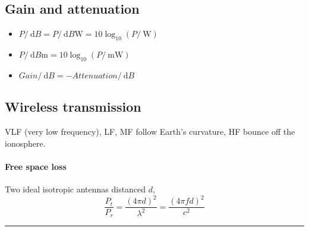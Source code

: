 \documentclass{form}
\begin{document}
\begin{minipage}[c]{0.20\textwidth}

    \subsection*{Gain and attenuation}

    \begin{itemize}
        \setlength\itemsep{-0.2em}
        \item $P/\SI{}{\deci B} = P/\SI{}{\deci B \watt} = 10 \log_{10}{(P/\SI{}{\watt})}$
        \item $P/\SI{}{\deci B \milli} = 10 \log_{10}{(P/\SI{}{\milli\watt})}$
        \item $Gain/\SI{}{\deci B} = -Attenuation/\SI{}{\deci B}$
    \end{itemize}

    \subsection*{Wireless transmission}
    VLF (very low frequency), LF, MF follow Earth's curvature, HF bounce off the ionosphere.

    \paragraph{Free space loss}
    Two ideal isotropic antennas distanced $d$,
    \begin{equation*}
        \frac{P_t}{P_r} = \frac{(4\pi d)^2}{\lambda ^2} = \frac{(4\pi f d)^2}{c^2}
    \end{equation*}
\end{minipage}

\vspace{-0em}\rule{\textwidth}{1.0pt}
\end{document}
